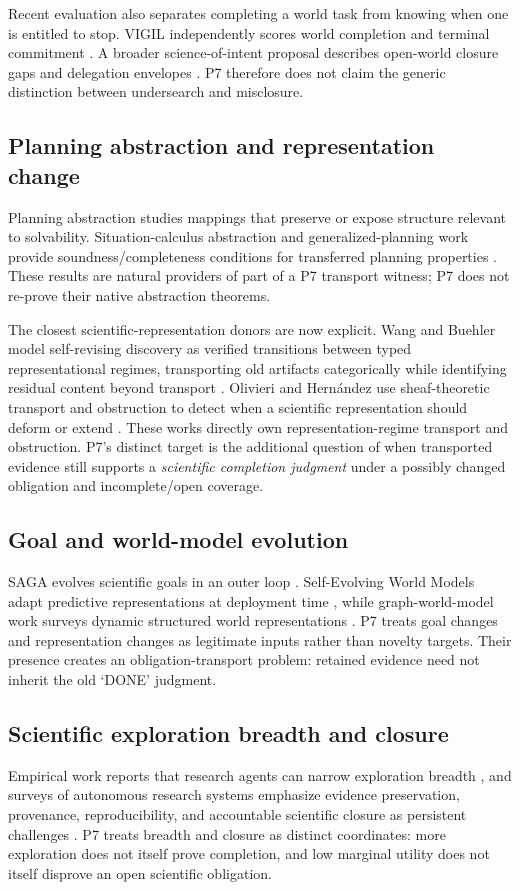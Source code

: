 \documentclass[11pt]{article}
\begin{document}
Recent evaluation also separates completing a world task from knowing when one is entitled to stop. VIGIL independently scores world completion and terminal commitment \cite{vigil2026}. A broader science-of-intent proposal describes open-world closure gaps and delegation envelopes \cite{intent2026}. P7 therefore does not claim the generic distinction between undersearch and misclosure.

\subsection{Planning abstraction and representation change}
Planning abstraction studies mappings that preserve or expose structure relevant to solvability. Situation-calculus abstraction and generalized-planning work provide soundness/completeness conditions for transferred planning properties \cite{banihashemi2017,dong2025}. These results are natural providers of part of a P7 transport witness; P7 does not re-prove their native abstraction theorems.

The closest scientific-representation donors are now explicit. Wang and Buehler model self-revising discovery as verified transitions between typed representational regimes, transporting old artifacts categorically while identifying residual content beyond transport \cite{categorical2026}. Olivieri and Hern\'andez use sheaf-theoretic transport and obstruction to detect when a scientific representation should deform or extend \cite{sheaf2026}. These works directly own representation-regime transport and obstruction. P7's distinct target is the additional question of when transported evidence still supports a \emph{scientific completion judgment} under a possibly changed obligation and incomplete/open coverage.

\subsection{Goal and world-model evolution}
SAGA evolves scientific goals in an outer loop \cite{saga2025}. Self-Evolving World Models adapt predictive representations at deployment time \cite{sewm2026}, while graph-world-model work surveys dynamic structured world representations \cite{gwm2026}. P7 treats goal changes and representation changes as legitimate inputs rather than novelty targets. Their presence creates an obligation-transport problem: retained evidence need not inherit the old `DONE' judgment.

\subsection{Scientific exploration breadth and closure}
Empirical work reports that research agents can narrow exploration breadth \cite{narrow2026}, and surveys of autonomous research systems emphasize evidence preservation, provenance, reproducibility, and accountable scientific closure as persistent challenges \cite{autoresearch2026}. P7 treats breadth and closure as distinct coordinates: more exploration does not itself prove completion, and low marginal utility does not itself disprove an open scientific obligation.
\end{document}
